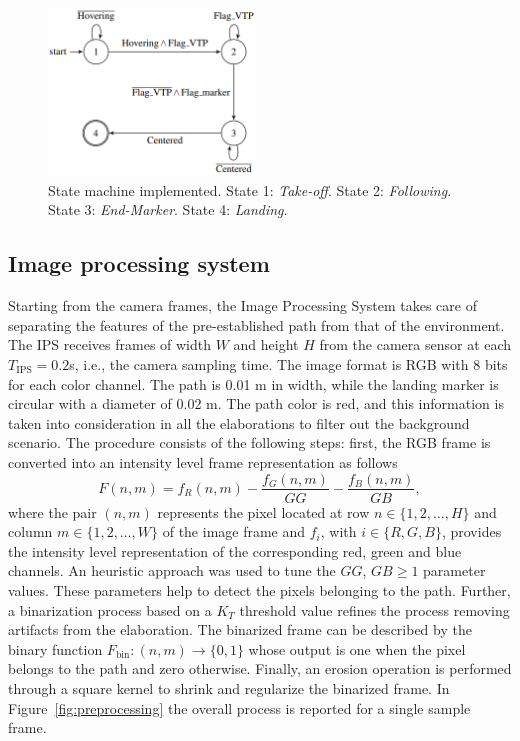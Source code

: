 \documentclass[a4paper,twocolumn,10pt]{article}
\begin{document}
    \begin{figure}
        \centering
        \includegraphics[width=0.49\textwidth]{pics/fig5_lines.png}
        \caption{State machine implemented. State 1: \textit{Take-off}. State 2: \textit{Following}. State 3: \textit{End-Marker}. State 4: \textit{Landing}.} 
        \label{fig:state machine}
    \end{figure} 

    \subsection{Image processing system}
    \label{sec:imageProcessingSystem}

    Starting from the camera frames, the Image Processing System takes care of separating the features of the 
    pre-established path from that of the environment.
    The IPS receives frames of width $W$ and height $H$ from the camera sensor at each   
    $T_\mathrm{IPS} = 0.2$s, i.e., the camera sampling time. The image format is RGB with 
    $8$ bits for each color channel. The path is 0.01 m in width, while the landing marker 
    is circular with a diameter of 0.02 m. The path color is red, and this information is 
    taken into consideration in all the elaborations to filter out the background scenario. The 
    procedure consists of the following steps: first, the RGB frame is converted into an intensity 
    level frame representation as follows 
    \begin{equation}
        F(n,m)=f_R(n,m) -  \frac{f_G(n,m)}{GG} - \frac{f_B(n,m)}{GB} ,
    \end{equation}
    where the pair $(n,m)$ represents the pixel located at row $n \in \{1, 2, \dots, H\}$ and column $m 
    \in \{1, 2, \dots, W\}$ of the image frame and $f_i$, with $i \in \{R, G, B\}$, provides the intensity level representation of the corresponding red, green and blue channels. An heuristic 
    approach was used to tune the $GG$, $GB \geq 1$ parameter values. These parameters help to detect the pixels belonging to the path. Further, a binarization process based on a $K_T$  threshold value refines the process removing artifacts from the elaboration. The binarized frame can be described by the binary 
    function $F_\mathrm{bin} \colon (n,m) \to \{0, 1\}$ whose output is one when the pixel belongs to the path and zero otherwise. Finally, an erosion operation is performed through a 
    square kernel to shrink and regularize the binarized frame. In Figure~\ref{fig:preprocessing} the overall process is reported for a single sample frame.
\end{document}
